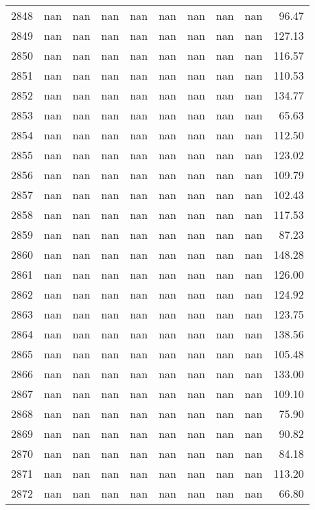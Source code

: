 \begin{tabular}{lrrrrrrrrr}
2848 & nan & nan & nan & nan & nan & nan & nan & nan & 96.47 \\
2849 & nan & nan & nan & nan & nan & nan & nan & nan & 127.13 \\
2850 & nan & nan & nan & nan & nan & nan & nan & nan & 116.57 \\
2851 & nan & nan & nan & nan & nan & nan & nan & nan & 110.53 \\
2852 & nan & nan & nan & nan & nan & nan & nan & nan & 134.77 \\
2853 & nan & nan & nan & nan & nan & nan & nan & nan & 65.63 \\
2854 & nan & nan & nan & nan & nan & nan & nan & nan & 112.50 \\
2855 & nan & nan & nan & nan & nan & nan & nan & nan & 123.02 \\
2856 & nan & nan & nan & nan & nan & nan & nan & nan & 109.79 \\
2857 & nan & nan & nan & nan & nan & nan & nan & nan & 102.43 \\
2858 & nan & nan & nan & nan & nan & nan & nan & nan & 117.53 \\
2859 & nan & nan & nan & nan & nan & nan & nan & nan & 87.23 \\
2860 & nan & nan & nan & nan & nan & nan & nan & nan & 148.28 \\
2861 & nan & nan & nan & nan & nan & nan & nan & nan & 126.00 \\
2862 & nan & nan & nan & nan & nan & nan & nan & nan & 124.92 \\
2863 & nan & nan & nan & nan & nan & nan & nan & nan & 123.75 \\
2864 & nan & nan & nan & nan & nan & nan & nan & nan & 138.56 \\
2865 & nan & nan & nan & nan & nan & nan & nan & nan & 105.48 \\
2866 & nan & nan & nan & nan & nan & nan & nan & nan & 133.00 \\
2867 & nan & nan & nan & nan & nan & nan & nan & nan & 109.10 \\
2868 & nan & nan & nan & nan & nan & nan & nan & nan & 75.90 \\
2869 & nan & nan & nan & nan & nan & nan & nan & nan & 90.82 \\
2870 & nan & nan & nan & nan & nan & nan & nan & nan & 84.18 \\
2871 & nan & nan & nan & nan & nan & nan & nan & nan & 113.20 \\
2872 & nan & nan & nan & nan & nan & nan & nan & nan & 66.80 \\

\end{tabular}
